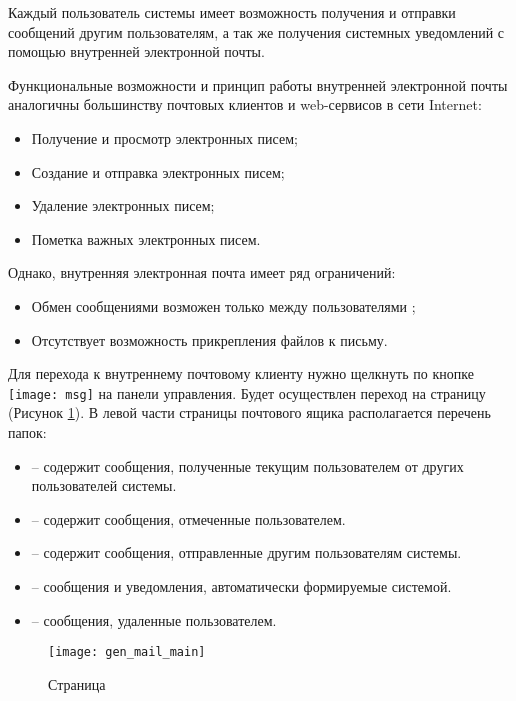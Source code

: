 Каждый пользователь системы имеет возможность получения и отправки сообщений другим пользователям, а так же получения системных уведомлений с помощью внутренней электронной почты.

Функциональные возможности и принцип работы внутренней электронной почты аналогичны большинству почтовых клиентов и web-сервисов в сети Internet:
\begin{itemize}
 \item Получение и просмотр электронных писем;
 \item Создание и отправка электронных писем;
 \item Удаление электронных писем;
 \item Пометка важных электронных писем.
\end{itemize}

Однако, внутренняя электронная почта имеет ряд ограничений:
\begin{itemize}
 \item Обмен сообщениями возможен только между пользователями \tmisr;
 \item Отсутствует возможность прикрепления файлов к письму.
\end{itemize}
 
Для перехода к внутреннему почтовому клиенту нужно щелкнуть по кнопке \texttt{[image: msg]} на панели управления. Будет осуществлен переход на страницу  (Рисунок \ref{img_gen_mail_main}). В левой части страницы почтового ящика располагается перечень папок:
\begin{itemize}
 \item {} -- содержит сообщения, полученные текущим пользователем от других пользователей системы.
 \item {} -- содержит сообщения, отмеченные пользователем.
 \item {} -- содержит сообщения, отправленные другим пользователям системы.
 \item {} -- сообщения и уведомления, автоматически формируемые системой.
 \item {} -- сообщения, удаленные пользователем.
\end{itemize}

 \begin{figure}[!ht]\centering
 	\texttt{[image: gen\_mail\_main]}
 	\caption{Страница }
 	\label{img_gen_mail_main}
 \end{figure}

